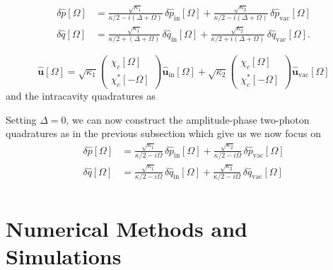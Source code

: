 \begin{equation}
\begin{split}
    \delta \hat{p}[\Omega] &=  \frac{\sqrt{\kappa_1}}{\kappa/2-i(\Delta+\Omega)} \, \delta \hat{p}_{\mathrm{in}}[\Omega] + \frac{\sqrt{\kappa_2}}{\kappa/2-i(\Delta+\Omega)} \, \delta \hat{p}_{\mathrm{vac}}[\Omega] \\
    \delta \hat{q}[\Omega] &=  \frac{\sqrt{\kappa_1}}{\kappa/2+(\Delta+\Omega)} \, \delta \hat{q}_{\mathrm{in}}[\Omega] + \frac{\sqrt{\kappa_2}}{\kappa/2+i(\Delta+\Omega)} \, \delta \hat{q}_{\mathrm{vac}}[\Omega].
\end{split}
\end{equation}

\begin{equation}
  \mathbf{\hat{u}}[\Omega] = \sqrt{\kappa_1}\begin{pmatrix}
    \chi_c[\Omega] \\  
    \chi^*_c[-\Omega]
  \end{pmatrix} \mathbf{\hat{u}_{\mathrm{in}}}[\Omega]
  + \sqrt{\kappa_2}\begin{pmatrix}
    \chi_c[\Omega] \\  
    \chi^*_c[-\Omega]
  \end{pmatrix}\mathbf{\hat{u}_{\mathrm{vac}}}[\Omega]
\end{equation}
and the intracavity quadratures as 

Setting $\Delta = 0$, we can now construct the amplitude-phase two-photon quadratures as in the previous subsection which give us 
we now focus on 
\begin{equation}
\begin{split}
  \delta \hat{p}[\Omega] &=  \frac{\sqrt{\kappa_1}}{\kappa/2-i\Omega} \, \delta \hat{p}_{\mathrm{in}}[\Omega] + \frac{\sqrt{\kappa_2}}{\kappa/2-i\Omega} \, \delta \hat{p}_{\mathrm{vac}}[\Omega] \\
  \delta \hat{q}[\Omega] &=  \frac{\sqrt{\kappa_1}}{\kappa/2-i\Omega} \, \delta \hat{q}_{\mathrm{in}}[\Omega] + \frac{\sqrt{\kappa_2}}{\kappa/2-i\Omega} \, \delta \hat{q}_{\mathrm{vac}}[\Omega] \\
\end{split}
\end{equation}
\section{Numerical Methods and Simulations}
